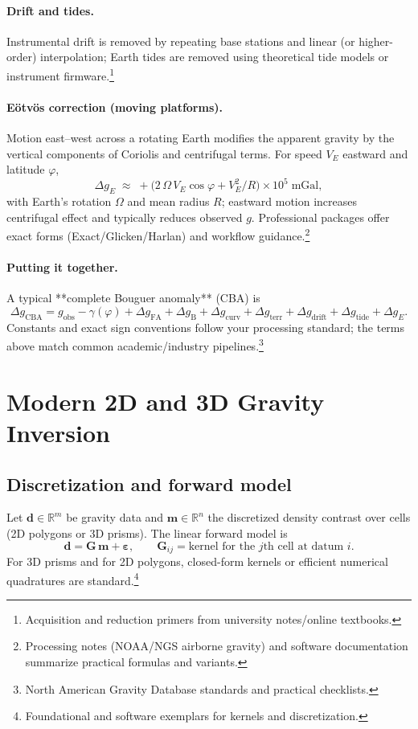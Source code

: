 \documentclass[11pt,a4paper]{article}
\begin{document}
\paragraph{Drift and tides.} Instrumental drift is removed by repeating base stations and linear (or higher-order) interpolation; Earth tides are removed using theoretical tide models or instrument firmware.\footnote{Acquisition and reduction primers from university notes/online textbooks.}

\paragraph{E\"otv\"os correction (moving platforms).} Motion east--west across a rotating Earth modifies the apparent gravity by the vertical components of Coriolis and centrifugal terms. For speed $V_E$ eastward and latitude $\varphi$,
\begin{equation}
  \Delta g_{E}\;\approx\;+\big(2\,\Omega\,V_E\cos\varphi + V_E^2/R\big)\times10^5\;\text{mGal},
\end{equation}
with Earth's rotation $\Omega$ and mean radius $R$; eastward motion increases centrifugal effect and typically reduces observed $g$. Professional packages offer exact forms (Exact/Glicken/Harlan) and workflow guidance.\footnote{Processing notes (NOAA/NGS airborne gravity) and software documentation summarize practical formulas and variants.}

\paragraph{Putting it together.} A typical **complete Bouguer anomaly** (CBA) is
\begin{equation}
  \Delta g_{\text{CBA}} = g_{\text{obs}} - \gamma(\varphi) + \Delta g_{\text{FA}} + \Delta g_{\text{B}} + \Delta g_{\text{curv}} + \Delta g_{\text{terr}} + \Delta g_{\text{drift}} + \Delta g_{\text{tide}} + \Delta g_{E}.
\end{equation}
Constants and exact sign conventions follow your processing standard; the terms above match common academic/industry pipelines.\footnote{North American Gravity Database standards and practical checklists.}

\section{Modern 2D and 3D Gravity Inversion}
\subsection{Discretization and forward model}
Let $\mathbf{d}\in\mathbb{R}^m$ be gravity data and $\mathbf{m}\in\mathbb{R}^n$ the discretized density contrast over cells (2D polygons or 3D prisms). The linear forward model is
\begin{equation}
  \mathbf{d} = \mathbf{G}\,\mathbf{m} + \boldsymbol{\varepsilon},\qquad \mathbf{G}_{ij}=\text{kernel for the $j$th cell at datum $i$}.
\end{equation}
For 3D prisms and for 2D polygons, closed-form kernels or efficient numerical quadratures are standard.\footnote{Foundational and software exemplars for kernels and discretization.}
\end{document}
